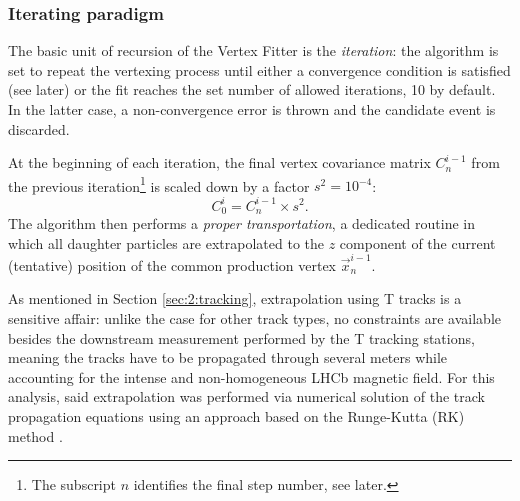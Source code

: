 \subsubsection{Iterating paradigm}
The basic unit of recursion of the Vertex Fitter is the \textit{iteration}:
the algorithm is set to repeat the vertexing process until either a convergence condition is satisfied (see later) or the fit reaches the set number of allowed iterations, 10 by default.
In the latter case, a non-convergence error is thrown and the candidate event is discarded.

At the beginning of each iteration, the final vertex covariance matrix $C^{i-1}_n$ from the previous iteration\footnote{The subscript $n$ identifies the final step number, see later.} is scaled down by a factor $s^2 = {10}^{-4}$:
\begin{equation}
	C^{i}_0 = C^{i-1}_n \times s^2.
\end{equation}
The algorithm then performs a \textit{proper transportation}, a dedicated routine in which all daughter particles are extrapolated to the $z$ component of the current (tentative) position of the common production vertex $\vec{x}_n^{i-1}$.

As mentioned in Section \ref{sec:2:tracking}, extrapolation using T tracks is a sensitive affair:
unlike the case for other track types, no constraints are available besides the downstream measurement performed by the T tracking stations, meaning the tracks have to be propagated through several meters while accounting for the intense and non-homogeneous LHCb magnetic field.
For this analysis, said extrapolation was performed via numerical solution of the track propagation equations using an approach based on the Runge-Kutta (RK) method \cite{Bos:1070314} \cite{Hairer1993}.

%
%

